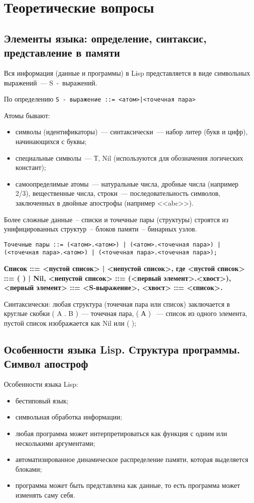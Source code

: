 \chapter{Теоретические вопросы}

\section{Элементы языка: определение, синтаксис, представление в памяти}

Вся информация (данные и программы) в Lisp представляется в виде символьных выражений~--- S~-~выражений.

По определению \texttt{S~-~выражение ::= <атом>|<точечная пара>}

Атомы бывают:
\begin{itemize}
	\item символы (идентификаторы)~--- синтаксически~--- набор литер (букв и цифр), начинающихся с буквы;
	\item специальные символы~--- {Т, Nil} (используются для обозначения логических констант);
	\item самоопределимые атомы~--- натуральные числа, дробные числа (например 2/3), вещественные числа, строки~--- последовательность символов, заключенных в двойные апострофы (например <<abc>>).
\end{itemize}

Более сложные данные~-- списки и точечные пары (структуры) строятся из унифицированных структур~-- блоков памяти~-- бинарных узлов.

\texttt{Точечные пары ::= (<атом>.<атом>) | (<атом>.<точечная пара>) |(<точечная пара>.<атом>) | (<точечная пара>.<точечная пара>);}

\textbf{Список ::= <пустой список> | <непустой список>, где
<пустой список> ::= ( ) | Nil,
<непустой список> ::= (<первый элемент>.<хвост>),
<первый элемент> ::= <S-выражение>, <хвост> ::= <список>.}

Синтаксически: любая структура (точечная пара или список) заключается в круглые скобки ( A . B )~--- точечная пара, ( А ) ~--- список из одного элемента, пустой список изображается как Nil или ( );

\section{Особенности языка Lisp. Структура программы. Символ апостроф}

Особенности языка Lisp:
\begin{itemize}
	\item бестиповый язык;
	\item символьная обработка информации;
	\item любая программа может интерпретироваться как функция с одним или несколькими аргументами;
	\item автоматизированное динамическое распределение памяти, которая выделяется блоками;
	\item программа может быть представлена как данные, то есть программа может изменять саму себя.
\end{itemize}

